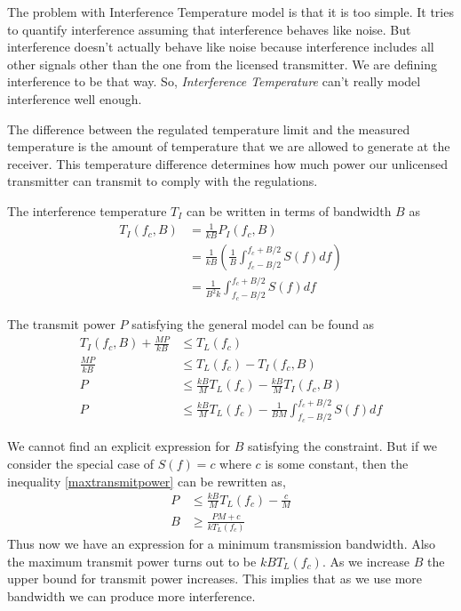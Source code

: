 \documentclass[12pt]{article}
\begin{document}
The problem with Interference Temperature model is that it is too simple. It tries to quantify interference assuming that interference behaves like noise. But interference doesn't actually behave like noise because interference includes all other signals other than the one from the licensed transmitter. We are defining interference to be that way. So, \emph{Interference Temperature} can't really model interference well enough.

The difference between the regulated temperature limit and the measured temperature is the amount of temperature that we are allowed to generate at the receiver. This temperature difference determines how much power our unlicensed transmitter can transmit to comply with the regulations.

The interference temperature $T_I$ can be written in terms of bandwidth $B$ as
\begin{align}
    T_I(f_c,B) & = \frac{1}{kB}P_I(f_c,B) \nonumber\\
    & = \frac{1}{kB}\left(\frac{1}{B}\int_{f_c-B/2}^{f_c+B/2}S(f)df\right) \nonumber\\
    & = \frac{1}{B^2k}\int_{f_c-B/2}^{f_c+B/2}S(f)df
\end{align}

The transmit power $P$ satisfying the general model can be found as
\begin{align}
    T_I(f_c,B) + \frac{MP}{kB} & \leq T_L(f_c) \nonumber \\
    \frac{MP}{kB} & \leq T_L(f_c) - T_I(f_c,B) \nonumber \\
    P & \leq \frac{kB}{M}T_L(f_c) - \frac{kB}{M}T_I(f_c,B) \nonumber \\
    P & \leq \frac{kB}{M}T_L(f_c) - \frac{1}{BM}\int_{f_c-B/2}^{f_c+B/2}S(f)df
    \label{maxtransmitpower}
\end{align}

We cannot find an explicit expression for $B$ satisfying the constraint. But if we consider the special case of $S(f) = c$ where $c$ is some constant, then the inequality \eqref{maxtransmitpower} can be rewritten as,
\begin{align}
    P & \leq \frac{kB}{M}T_L(f_c) - \frac{c}{M} \nonumber\\
    B & \geq \frac{PM + c}{kT_L(f_c)}
\end{align}
Thus now we have an expression for a minimum transmission bandwidth. Also the maximum transmit power turns out to be $kBT_L(f_c)$. As we increase $B$ the upper bound for transmit power increases. This implies that as we use more bandwidth we can produce more interference.
\end{document}

